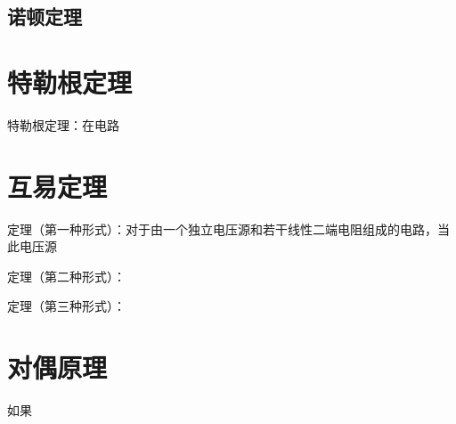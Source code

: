 \subsection{诺顿定理}

\section{特勒根定理}
特勒根定理：在电路

\section{互易定理}
定理（第一种形式）：对于由一个独立电压源和若干线性二端电阻组成的电路，当此电压源

定理（第二种形式）：

定理（第三种形式）：

\section{对偶原理}
如果